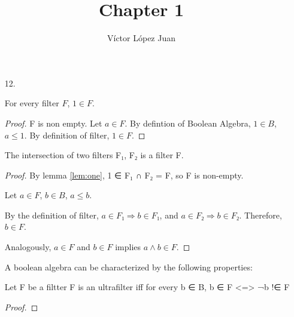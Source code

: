 \documentclass{article}
\author{Víctor López Juan}
\title{Chapter 1}
\begin{document}
\begin{enumerate}
  \item[12.]
    \begin{lemma}\label{lem:one}
      For every filter $F$, $1 ∈ F$.
    \end{lemma}
    \begin{proof}
      F is non empty. Let $a ∈ F$. By defintion of Boolean Algebra,
      $1 ∈ B$, $a ≤ 1$. By definition of filter, $1 ∈ F$.
    \end{proof}
    
    \begin{lemma}
      The intersection of two filters F₁, F₂ is a filter F.
    \end{lemma}
    \begin{proof}
      By lemma \ref{lem:one}, 1 ∈ F₁ ∩ F₂ = F, so F is non-empty.

      Let $a ∈ F$, $b ∈ B$, $a ≤ b$.

      By the definition of filter, $a ∈ F₁ ⇒ b ∈ F₁$, and $a ∈ F₂ ⇒ b ∈ F₂$.
      Therefore, $b ∈ F$.

      Analogously, $a ∈ F$ and $b ∈ F$ implies $a ∧ b ∈ F$.
    \end{proof}

    \begin{lemma}
      A boolean algebra can be characterized by the following properties:
    \end{lemma}
    
    
    
    \begin{lemma}
     Let F be a filtter
     F is an ultrafilter iff for every b ∈ B, b ∈ F <=> ¬b !∈ F
    \end{lemma}

    \begin{proof}
\end{proof}
\end{enumerate}
\end{document}
